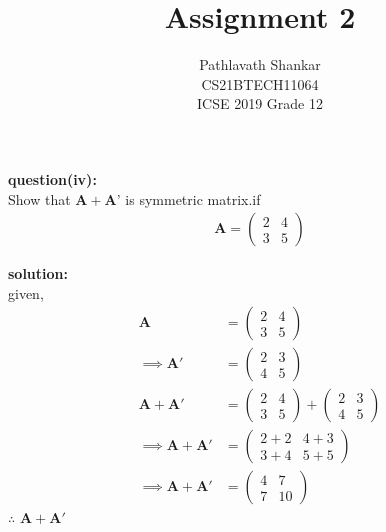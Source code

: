 \documentclass[12pt,two column]{article}
\title{Assignment 2}
\author{ Pathlavath Shankar\\\normalsize CS21BTECH11064 \\ \vspace*{10pt} \Large ICSE 2019 Grade 12}
\newcommand{\myvec}[1]{\ensuremath{\begin{pmatrix}#1\end{pmatrix}}}
\let\vec\mathbf
\begin{document}
\maketitle

\textbf{question(iv): }\\
Show that $\vec{A} + \vec{A’}$ is symmetric matrix.if
\begin{align}
     \vec{A} = \myvec{2 &  4 \\ 3 & 5}
\end{align}

 

\textbf{solution: }\\
given,
\begin{align}
\vec{A} &= \myvec{2 &  4 \\ 3 & 5}\\
\implies
\vec{A'} &=\myvec{2 &  3 \\ 4 & 5}\\
\vec{A}+\vec{A'} &= \myvec{2 &  4 \\ 3 & 5}+\myvec{2 &  3 \\ 4 & 5}\\
\implies
\vec{A}+\vec{A'} &= \myvec{2+2 &  4+3 \\ 3+4 & 5+5}\\
\implies
\vec{A}+\vec{A'} &= \myvec{4 &  7 \\ 7 & 10}
\end{align}
$\therefore$ $\vec{A}+\vec{A'}$ 
\end{document}
